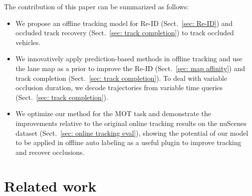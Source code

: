 \documentclass{article} \usepackage{iclr2023_conference,times}
\begin{document}
The contribution of this paper can be summarized as follows:
\vspace{-2mm}
\begin{itemize}
\item We propose an offline tracking model for Re-ID (Sect.~\ref{sec: Re-ID}) and occluded track recovery (Sect.~\ref{sec: track completion}) to track occluded vehicles.
\item We innovatively apply prediction-based methods in offline tracking and use the lane map as a prior to improve the Re-ID (Sect.~\ref{sec: map affinity}) and track completion (Sect.~\ref{sec: track completion}). To deal with variable occlusion duration, we decode trajectories from variable time queries (Sect.~\ref{sec: track completion}).
\item We optimize our method for the MOT task and demonstrate the improvements relative to the original online tracking results on the nuScenes dataset (Sect.~\ref{sec: online tracking eval}), showing the potential of our model to be applied in offline auto labeling as a useful plugin to improve tracking and recover occlusions.
\end{itemize}

\vspace{-2mm}
\section{Related work}
\label{related_work}
\vspace{-1mm}
\end{document}
